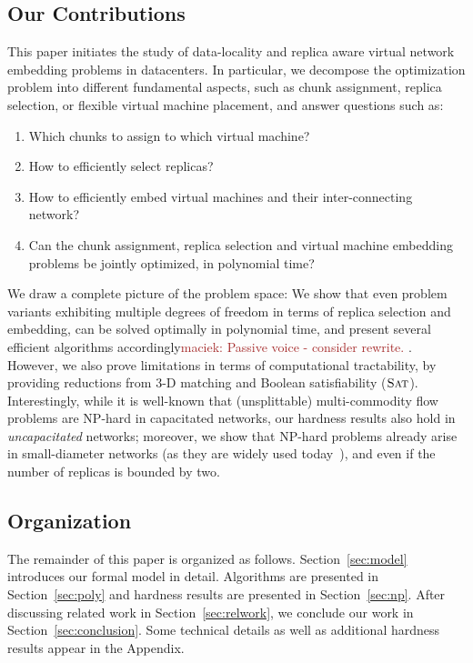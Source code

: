 \documentclass[9pt]{sigcomm-alternate}
\newcommand{\maciek}[1]{\textcolor{brown}{maciek: #1}}
\newcommand{\SAT}{\textsc{Sat}}
\begin{document}
\subsection{Our Contributions}

This paper initiates the study of data-locality and replica aware virtual network embedding problems in datacenters.
In particular, we decompose the optimization problem into different fundamental aspects, such as
chunk assignment, replica selection, or flexible virtual machine placement, and answer questions such as:
\begin{enumerate}
\item Which chunks to assign to which virtual machine?

\item How to efficiently select replicas?

\item How to efficiently embed virtual machines and their inter-connecting network?

\item Can the chunk assignment, replica selection and virtual machine embedding problems be jointly optimized, in polynomial time?
\end{enumerate}

We draw a complete picture of the problem space: We show that
even problem variants exhibiting multiple degrees of freedom in terms of
replica selection and embedding,
can be solved optimally in polynomial time, and present several efficient
algorithms accordingly\maciek{Passive voice - consider rewrite.}
. However, we also prove limitations in terms of
computational tractability, by providing reductions from 3-D matching
and Boolean satisfiability ($\SAT$). Interestingly,
while it is well-known that (unsplittable) multi-commodity flow
problems are NP-hard in capacitated networks, our hardness results also hold in \emph{uncapacitated}
networks; moreover, we show that NP-hard problems already arise in small-diameter networks (as they are
widely used today~\cite{fattree}),
and even if the number of replicas is bounded by two.


\subsection{Organization}

The remainder of this paper is organized as follows.
Section~\ref{sec:model} introduces our formal model in detail.
Algorithms are presented in Section~\ref{sec:poly} and
hardness results are presented in Section~\ref{sec:np}.
After discussing related work in Section~\ref{sec:relwork},
we conclude our work in Section~\ref{sec:conclusion}.
Some technical details as well as additional hardness results
appear in the Appendix.
\end{document}
